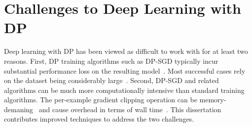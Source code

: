 \section{Challenges to Deep Learning with DP}
Deep learning with DP has been viewed as difficult to work with for at least two reasons. 
First, DP training algorithms such as DP-SGD typically incur substantial performance loss on the resulting model~\citep{abadi2016deep,hoory2021learning,kerrigan2020differentially}.
Most successful cases rely on the dataset being considerably large~\citep{ramaswamy2020training,mcmahan2017learning}.
Second, DP-SGD and related algorithms can be much more computationally intensive than standard training algorithms.
The per-example gradient clipping operation can be memory-demaning~\citep{hoory2021learning} and cause overhead in terms of wall time~\citep{carlini2019secret}.
This dissertation contributes improved techniques to address the two challenges.


